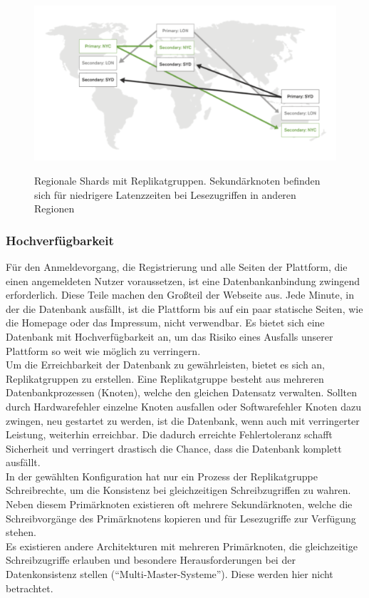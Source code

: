 \begin{figure}
	\centering
    \includegraphics[width=\textwidth]{sources/MongoDB_sharded.png}\cite{db:mongoActiveActiveImage}
	\caption{Regionale Shards mit Replikatgruppen. Sekundärknoten befinden sich für niedrigere Latenzzeiten bei Lesezugriffen in anderen Regionen}
	\label{fig:db:mongoActiveActive}
\end{figure}

\subsubsection{Hochverfügbarkeit}
Für den Anmeldevorgang, die Registrierung und alle Seiten der Plattform, die einen angemeldeten Nutzer voraussetzen, ist eine Datenbankanbindung zwingend erforderlich.
Diese Teile machen den Großteil der Webseite aus.
Jede Minute, in der die Datenbank ausfällt, ist die Plattform bis auf ein paar statische Seiten, wie die Homepage oder das Impressum, nicht verwendbar.
Es bietet sich eine Datenbank mit Hochverfügbarkeit an, um das Risiko eines Ausfalls unserer Plattform so weit wie möglich zu verringern.\\
Um die Erreichbarkeit der Datenbank zu gewährleisten, bietet es sich an, Replikatgruppen zu erstellen.
Eine Replikatgruppe besteht aus mehreren Datenbankprozessen (Knoten), welche den gleichen Datensatz verwalten. \cite{db:mongoReplicaSetMembers}
Sollten durch Hardwarefehler einzelne Knoten ausfallen oder Softwarefehler Knoten dazu zwingen, neu gestartet zu werden, ist die Datenbank, wenn auch mit verringerter Leistung, weiterhin erreichbar.
Die dadurch erreichte Fehlertoleranz schafft Sicherheit und verringert drastisch die Chance, dass die Datenbank komplett ausfällt.\\
In der gewählten Konfiguration hat nur ein Prozess der Replikatgruppe Schreibrechte, um die Konsistenz bei gleichzeitigen Schreibzugriffen zu wahren.
Neben diesem Primärknoten existieren oft mehrere Sekundärknoten, welche die Schreibvorgänge des Primärknotens kopieren und für Lesezugriffe zur Verfügung stehen.\\
Es existieren andere Architekturen mit mehreren Primärknoten, die gleichzeitige Schreibzugriffe erlauben und besondere Herausforderungen bei der Datenkonsistenz stellen (\enquote{Multi-Master-Systeme}).
Diese werden hier nicht betrachtet.

